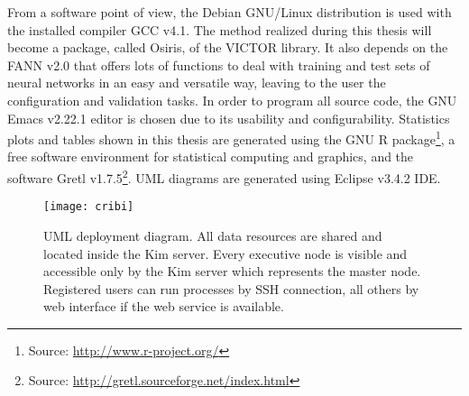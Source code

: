 From a software point of view, the Debian GNU/Linux distribution is used with the installed compiler GCC v4.1. The method realized during this thesis will become a package, called Osiris, of the \gls{VICTOR} library. It also depends on the \gls{FANN} v2.0 that offers lots of functions to deal with training and test sets of neural networks in an easy and versatile way, leaving to the user the configuration and validation tasks. In order to program all source code, the GNU Emacs v2.22.1 editor is chosen due to its usability and configurability. Statistics plots and tables shown in this thesis are generated using the GNU R package\footnote{Source: \href{http://www.r-project.org/}{http://www.r-project.org/}}, a free software environment for statistical computing and graphics, and the software Gretl v1.7.5\footnote{Source: \href{http://gretl.sourceforge.net/index.html}{http://gretl.sourceforge.net/index.html}}. UML diagrams are generated using Eclipse v3.4.2 IDE.
\begin{figure}[tb]
	\begin{center}
		\texttt{[image: cribi]}
		\caption[Cluster of computers at CRIBI]{UML deployment diagram. All data resources are shared and located inside the Kim server. Every executive node is visible and accessible only by the Kim server which represents the master node. Registered users can run processes by SSH connection, all others by web interface if the web service is available.}
		\label{fig:cribi}
	\end{center}
\end{figure}



